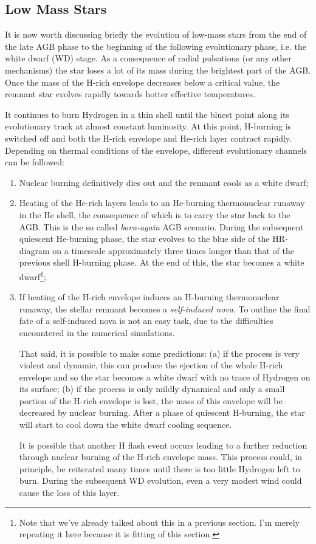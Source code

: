 \subsection{Low Mass Stars}

It is now worth discussing briefly the evolution of low-mass stars from the end of the late AGB phase to the beginning of the following evolutionary phase, i.e. the white dwarf (WD) stage. As a consequence of radial pulsations (or any other mechanisms) the star loses a lot of its mass during the brightest part of the AGB. Once the mass of the H-rich envelope decreases below a critical value, the remnant star evolves rapidly towards hotter effective temperatures.
\par It continues to burn Hydrogen in a thin shell until the bluest point along its evolutionary track at almost constant luminosity. At this point, H-burning is switched off and both the H-rich envelope and He-rich layer contract rapidly. Depending on thermal conditions of the envelope, different evolutionary channels can be followed:
\begin{enumerate}
    \item Nuclear burning definitively dies out and the remnant cools as a white dwarf;
    \item Heating of the He-rich layers leads to an He-burning thermonuclear runaway in the He shell, the consequence of which is to carry the star back to the AGB. This is the so called \emph{born-again} AGB scenario. During the subsequent quiescent He-burning phase, the star evolves to the blue side of the HR-diagram on a timescale approximately three times longer than that of the previous shell H-burning phase. At the end of this, the star becomes a white dwarf\footnote{Note that we've already talked about this in a previous section. I'm merely repeating it here because it is fitting of this section.};
    \item If heating of the H-rich envelope induces an H-burning thermonuclear runaway, the stellar remnant becomes a \emph{self-induced nova}. To outline the final fate of a self-induced nova is not an easy task, due to the difficulties encountered in the numerical simulations.
    \par That said, it is possible to make some predictions: (a) if the process is very violent and dynamic, this can produce the ejection of the whole H-rich envelope and so the star becomes a white dwarf with no trace of Hydrogen on its surface; (b) if the process is only mildly dynamical and only a small portion of the H-rich envelope is lost, the mass of this envelope will be decreased by nuclear burning. After a phase of quiescent H-burning, the star will start to cool down the white dwarf cooling sequence.
    \par It is possible that another H flash event occurs leading to a further reduction through nuclear burning of the H-rich envelope mass. This process could, in principle, be reiterated many times until there is too little Hydrogen left to burn. During the subsequent WD evolution, even a very modest wind could cause the loss of this layer.
\end{enumerate}
